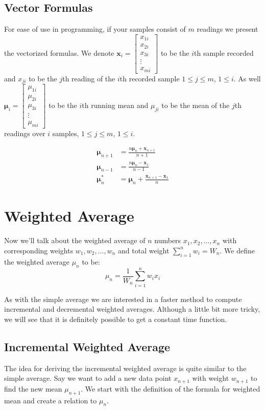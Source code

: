 \documentclass[english,12pt]{article}
\theoremstyle{plain}
\theoremstyle{definition}
\theoremstyle{definition} %
\begin{document}
\subsection{Vector Formulas}
For ease of use in programming, if your samples consist of $m$ readings we present the vectorized formulas.  We denote $\mathbf{x}_i = \begin{bmatrix}
x_{1i}\\
x_{2i}\\
x_{3i}\\
\vdots\\
x_{mi}
\end{bmatrix}$ to be the $i$th sample recorded and $x_{ji}$ to be the $j$th reading of the $i$th recorded sample $1\le j\le m$, $1\le i$.  As well $\boldsymbol{\mu}_i = \begin{bmatrix}
\mu_{1i}\\
\mu_{2i}\\
\mu_{3i}\\
\vdots\\
\mu_{mi}
\end{bmatrix}$ to be the $i$th running mean and $\mu_{ji}$ to be the mean of the $j$th readings over $i$ samples, $1\le j\le m$, $1\le i$.

\begin{align*}
\boldsymbol{\mu}_{n + 1} &= \frac{n\boldsymbol{\mu}_n + \mathbf{x}_{n+1}}{n + 1}\\
\boldsymbol{\mu}_{n - 1} &= \frac{n\boldsymbol{\mu}_n - \mathbf{x}_1}{n-1}\\
\boldsymbol{\mu}_n^\ast &= \boldsymbol{\mu}_n + \frac{\mathbf{x}_{n+1} - \mathbf{x}_{1}}{n}
\end{align*}

\section{Weighted Average}
Now we'll talk about the weighted average of $n$ numbers $x_1, x_2,\ldots, x_n$ with corresponding weights $w_1,w_2,\ldots, w_n$ and total weight $\sum_{i=1}^n w_i = W_n$.  We define the weighted average $\mu_n$ to be:
\[\mu_n=\frac{1}{W_n}\sum_{i=1}^n w_ix_i\]

As with the simple average we are interested in a faster method to compute incremental and decremental weighted averages.  Although a little bit more tricky, we will see that it is definitely possible to get a constant time function.

\subsection{Incremental Weighted Average}
The idea for deriving the incremental weighted average is quite similar to the simple average.  Say we want to add a new data point $x_{n+1}$ with weight $w_{n+1}$ to find the new mean $\mu_{n+1}$.  We start with the definition of the formula for weighted mean and create a relation to $\mu_n$.
\end{document}
